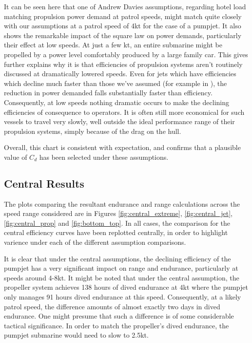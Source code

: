 \documentclass{article}\usepackage[]{graphicx}\usepackage[]{color}
\begin{document}
It can be seen here that one of Andrew Davies assumptions, regarding hotel load matching propulsion power demand at patrol speeds, might match quite closely with our assumptions at a patrol speed of 4kt for the case of a pumpjet.  It also shows the remarkable impact of the square law on power demands, particularly their effect at low speeds.  At just a few kt, an entire submarine might be propelled by a power level comfortably produced by a large family car.  This gives further explains why it is that efficiencies of propulsion systems aren't routinely discussed at dramatically lowered speeds. Even for jets which have efficiencies which decline much faster than those we've assumed (for example in \cite{fujisawa1995}), the reduction in power demanded falls substantially faster than efficiency.  Consequently, at low speeds nothing dramatic occurs to make the declining efficiencies of consequence to operators. It is often still more economical for such vessels to travel very slowly, well outside the ideal performance range of their propulsion systems, simply because of the drag on the hull.

Overall, this chart is consistent with expectation, and confirms that a plausible value of $C_d$ has been selected under these assumptions.

\subsection{Central Results}
The plots comparing the resultant endurance and range calculations across the speed range considered are in Figures \ref{fig:central_extreme}, \ref{fig:central_jet}, \ref{fig:central_prop} and \ref{fig:bottom_top}.  In all cases, the comparison for the central efficiency curves have been replotted centrally, in order to highlight varience under each of the different assumption comparisons.

It is clear that under the central assumptions, the declining efficiency of the pumpjet has a very significant impact on range and endurance, particularly at speeds around 4-8kt. It might be noted that under the central assumption, the propeller system achieves 138 hours of dived endurance at 4kt where the pumpjet only manages 91 hours dived endurance at this speed.  Consequently, at a likely patrol speed, the difference amounts of almost exactly two days in dived endurance. One might presume that such a difference is of some considerable tactical significance.  In order to match the propeller's dived endurance, the pumpjet submarine would need to slow to 2.5kt.
\end{document}
